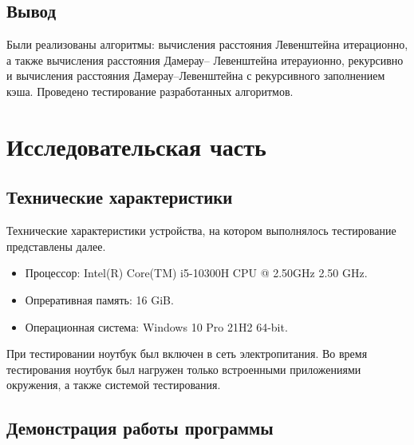 \documentclass[a4paper,14pt, unknownkeysallowed]{bmstu}
\begin{document}
\section{Вывод}

Были реализованы алгоритмы: вычисления расстояния Левенштейна
итерационно, а также вычисления расстояния Дамерау–
Левенштейна итерауионно, рекурсивно и вычисления расстояния Дамерау–Левенштейна с рекурсивного заполнением кэша. Проведено тестирование разработанных алгоритмов.

\chapter{Исследовательская часть}

\section{Технические характеристики}

Технические характеристики устройства, на котором выполнялось тестирование представлены далее.

\begin{itemize}
	\item Процессор: Intel(R) Core(TM) i5-10300H CPU @ 2.50GHz 2.50 GHz.
	\item Опреративная память: 16 GiB.
	\item Операционная система: Windows 10 Pro 21H2 64-bit.
\end{itemize}

При тестировании ноутбук был включен в сеть электропитания. Во время тестирования ноутбук был нагружен только встроенными приложениями
окружения, а также системой тестирования.

\section{Демонстрация работы программы}
\end{document}
